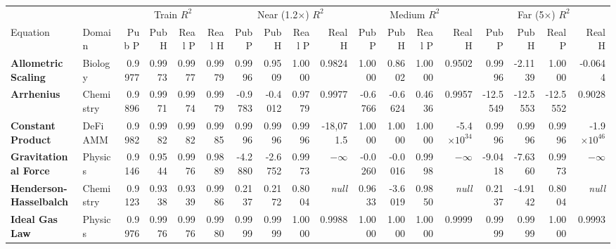 \documentclass[11pt]{article}
\begin{document}
\begin{landscape}
\begin{adjustbox}{width=\linewidth,center}
\begin{tabular}{l l *{4}{r} *{4}{r} *{4}{r} *{4}{r}}
\toprule
& & \multicolumn{4}{c}{Train $R^2$} & \multicolumn{4}{c}{Near (1.2$\times$) $R^2$} & \multicolumn{4}{c}{Medium $R^2$} & \multicolumn{4}{c}{Far (5$\times$) $R^2$} \\
\cmidrule(lr){3-6} \cmidrule(lr){7-10} \cmidrule(lr){11-14} \cmidrule(lr){15-18}
Equation & Domain & Pub P & Pub H & Real P & Real H & Pub P & Pub H & Real P & Real H & Pub P & Pub H & Real P & Real H & Pub P & Pub H & Real P & Real H \\
\midrule
\textbf{Allometric Scaling} & Biology & 0.9977 & 0.9973 & \cellcolor{match}0.9977 & \cellcolor{match}0.9979 & 0.9996 & 0.9509 & \cellcolor{match}1.0000 & \cellcolor{minor}0.9824 & 1.0000 & 0.8602 & \cellcolor{match}1.0000 & \cellcolor{minor}0.9502 & 0.9996 & -2.1139 & \cellcolor{match}1.0000 & \cellcolor{major}-0.0644 \\
\textbf{Arrhenius} & Chemistry & 0.9896 & 0.9971 & \cellcolor{match}0.9974 & \cellcolor{match}0.9979 & -0.9783 & -0.4012 & \cellcolor{major}0.9779 & \cellcolor{major}0.9977 & -0.6766 & -0.6624 & \cellcolor{major}0.4636 & \cellcolor{major}0.9957 & -12.5549 & -12.5553 & \cellcolor{match}-12.5552 & \cellcolor{major}0.9028 \\
\textbf{Constant Product} & DeFi AMM & 0.9982 & 0.9982 & \cellcolor{match}0.9982 & \cellcolor{match}0.9985 & 0.9996 & 0.9996 & \cellcolor{match}0.9996 & \cellcolor{major}-18{,}071.5 & 1.0000 & 1.0000 & \cellcolor{match}1.0000 & \cellcolor{major}-5.4$\times10^{34}$ & 0.9996 & 0.9996 & \cellcolor{match}0.9996 & \cellcolor{major}-1.9$\times10^{46}$ \\
\textbf{Gravitational Force} & Physics & 0.9146 & 0.9544 & \cellcolor{minor}0.9976 & \cellcolor{minor}0.9889 & -4.2880 & -2.6752 & \cellcolor{major}0.9973 & \cellcolor{major}$-\infty$ & -0.0260 & -0.0016 & \cellcolor{major}0.9998 & \cellcolor{major}$-\infty$ & -9.0418 & -7.6360 & \cellcolor{major}0.9973 & \cellcolor{major}$-\infty$ \\
\textbf{Henderson-Hasselbalch} & Chemistry & 0.9123 & 0.9338 & \cellcolor{minor}0.9339 & \cellcolor{minor}0.9986 & 0.2137 & 0.2172 & \cellcolor{major}0.8004 & \cellcolor{major}\textit{null} & 0.9633 & -3.6019 & \cellcolor{minor}0.9850 & \cellcolor{major}\textit{null} & 0.2137 & -4.9142 & \cellcolor{major}0.8004 & \cellcolor{major}\textit{null} \\
\textbf{Ideal Gas Law} & Physics & 0.9976 & 0.9976 & \cellcolor{match}0.9976 & \cellcolor{match}0.9980 & 0.9999 & 0.9999 & \cellcolor{match}1.0000 & \cellcolor{match}0.9988 & 1.0000 & 1.0000 & \cellcolor{match}1.0000 & \cellcolor{match}0.9999 & 0.9999 & 0.9999 & \cellcolor{match}1.0000 & \cellcolor{match}0.9993 \\

\end{tabular}
\end{adjustbox}
\end{landscape}
\end{document}
